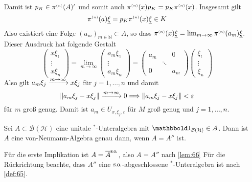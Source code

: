 \begin{beweis}
	Damit ist $p_K \in \pi^{\scriptscriptstyle(n)}(A)'$ und somit auch $\pi^{\scriptscriptstyle(n)}(x)p_K = p_K \pi^{\scriptscriptstyle(n)}(x)$. 
	Insgesamt gilt
	\[
		\pi^{\scriptscriptstyle(n)}(a) \underline{\xi} = p_K \pi^{\scriptscriptstyle(n)}(x) \underline{\xi} \in K
	\]
	Also existiert eine Folge $(a_m)_{m \in \mathbb{N}} \subset A$, so dass $\pi^{\scriptscriptstyle(n)}(x) \underline{\xi} = \lim_{m\to \infty} \pi^{\scriptscriptstyle(n)}(a_m) \underline{\xi}$.
	Dieser Ausdruck hat folgende Gestalt
	\[
		\begin{pmatrix}
			x \xi_1 \\ \vdots \\ x \xi_n 
		\end{pmatrix}
		= \lim_{m \to \infty}
		\begin{pmatrix}
			a_m \xi_1 \\ \vdots \\ a_m \xi_n
		\end{pmatrix}
		=
		\begin{pmatrix}
			a_m & & 0 \\
			& \ddots & \\
			0 & & a_m
		\end{pmatrix}
		\begin{pmatrix}
			\xi_1 \\ \vdots \\ \xi_n
		\end{pmatrix}
	\]
	Also gilt $a_m \xi_j \grenzw{m \to \infty} x \xi_j$ für $j=1,\ldots ,n$ und damit
	\[
		\norm*{a_m \xi_j - x \xi_j} \grenzw{m \to \infty} 0 \Longrightarrow \norm*{a_m \xi_j - x \xi_j} < \varepsilon
	\]
	für $m$ groß genug. Damit ist $a_m \in U_{x,\xi_j,\varepsilon}$ für $M$ groß genug und $j=1,\ldots ,n$.
\end{beweis}

\begin{korollar}[{name={von Neumanns Bikommutantensatz}},label=korr:67]
	Sei $A \subset \mathcal{B}(\mathcal{H})$ eine unitale $^*$-Unteralgebra mit $\ind_{\mathcal{B}(\mathcal{H})} \in A$.
	Dann ist $A$ eine von-Neumann-Algebra genau dann, wenn $A=A''$ ist.
\end{korollar}
\begin{beweis}
	Für die erste Implikation ist $A= \overline{A}^{\mathrm{s\mkern-1.4mu.\mkern-.6mu o\mkern-1.7mu.}}$, also $A=A''$ nach \autoref{lem:66}
	Für die Rückrichtung beachte, dass $A''$ eine $\mathrm{s\mkern-1.4mu.\mkern-.6mu o\mkern-1.7mu.}$-abgeschlossene $^*$-Unteralgebra ist nach \autoref{def:65}.
\end{beweis}

